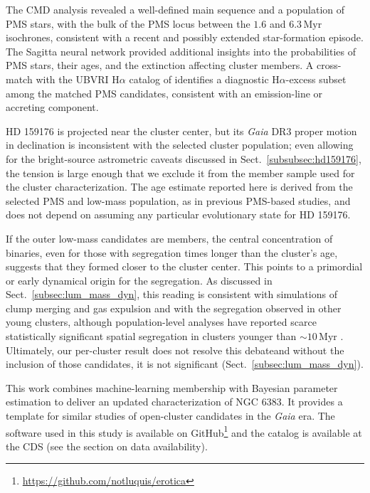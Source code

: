 \documentclass{aa}
\providecommand{\DIFaddtex}[1]{{\protect\color{red}\uwave{#1}}} %
\providecommand{\DIFaddbegin}{} %
\providecommand{\DIFaddend}{} %
\providecommand{\DIFadd}[1]{\texorpdfstring{\DIFaddtex{#1}}{#1}} %
\providecommand{\DIFaddincludegraphics}[2][]{{\color{blue}\fbox{\DIFOincludegraphics[#1]{#2}}}} %
\DeclareRobustCommand{\DIFaddbegin}{\DIFOaddbegin \let\includegraphics\DIFaddincludegraphics} %
\DeclareRobustCommand{\DIFaddend}{\DIFOaddend \let\includegraphics\DIFOincludegraphics} %
\begin{document}
The CMD analysis revealed a well-defined main sequence and a population of PMS stars, with the bulk of the PMS locus between the $1.6$ and $6.3\,\mathrm{Myr}$ isochrones, consistent with a recent and possibly extended star-formation episode. The Sagitta neural network provided additional insights into the probabilities of PMS stars, their ages, and the extinction affecting cluster members. A cross-match with the UBVRI H$\alpha$ catalog of \citet{2010AA...511A..25R} identifies a diagnostic H$\alpha$-excess subset among the matched PMS candidates, consistent with an emission-line or accreting component.

HD 159176 is projected near the cluster center, but its \textit{Gaia} DR3 proper motion in declination is inconsistent with the selected cluster population; even allowing for the bright-source astrometric caveats discussed in Sect.~\ref{subsubsec:hd159176}, the tension is large enough that we exclude it from the member sample used for the cluster characterization. The age estimate reported here is derived from the selected PMS and low-mass population, as in previous PMS-based studies, and does not depend on assuming any particular evolutionary state for HD 159176.

If the outer low-mass candidates are members, the central concentration of binaries, even for those with segregation times longer than the cluster's age, suggests that they formed closer to the cluster center. This points to a primordial or early dynamical origin for the segregation. As discussed in Sect.~\ref{subsec:lum_mass_dyn}, this reading is consistent with simulations of clump merging and gas expulsion and with the segregation observed in other young clusters, although population-level analyses have reported scarce statistically significant spatial segregation in clusters younger than $\sim10\,\mathrm{Myr}$ \citep{2026AJ....171..236Z}. Ultimately, our per-cluster result does not resolve this debate\DIFaddbegin \DIFadd{, }\DIFaddend and without the inclusion of those candidates, it is not significant (Sect.~\ref{subsec:lum_mass_dyn}).

This work combines machine-learning membership with Bayesian parameter estimation to deliver an updated characterization of NGC 6383. It provides a template for similar studies of open-cluster candidates in the \textit{Gaia} era. The software used in this study is available on GitHub\footnote{\href{https://github.com/notluquis/erotica}{https://github.com/notluquis/erotica}} and the catalog is available at the CDS (see the section on data availability).
\end{document}
